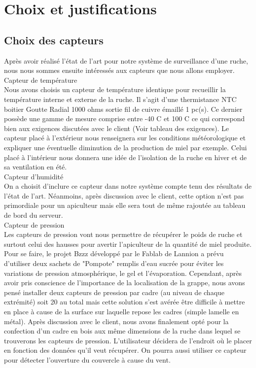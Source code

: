 

\chapter{Choix et justifications}

\section{Choix des capteurs}
\vspace{1.5cm}
Après avoir réalisé l'état de l'art pour notre système de surveillance d'une ruche, nous nous sommes ensuite intéressés aux capteurs que nous allons employer.\\

Capteur de température\\

Nous avons choisis un capteur de température identique pour recueillir la température interne et externe de la ruche.
Il s'agit d'une thermistance NTC boitier Goutte Radial 1000 ohms sortie fil de cuivre émaillé 1 pc(s). Ce dernier possède une gamme de mesure comprise entre -40 C et 100 C ce qui correspond bien aux exigences discutées avec le client (Voir tableau des exigences). Le capteur placé à l'extérieur nous renseignera sur les conditions météorologique et expliquer une éventuelle diminution de la production de miel par exemple. Celui placé à l'intérieur nous donnera une idée de l'isolation de la ruche en hiver et de sa ventilation en été.\\  

Capteur d'humidité\\

On a choisit d'inclure ce capteur dans notre système compte tenu des résultats de l'état de l'art. Néanmoins, après discussion avec le client, cette option n'est pas primordiale pour un apiculteur mais elle sera tout de même rajoutée au tableau de bord du serveur.\\

Capteur de pression\\

Les capteurs de pression vont nous permettre de récupérer le poids de ruche et surtout celui des hausses pour avertir l'apiculteur de la quantité de miel produite. Pour se faire, le projet Bzzz développé par le Fablab de Lannion a prévu d'utiliser deux sachets de "Pompote" remplis d'eau sucrée pour éviter les variations de pression atmosphérique, le gel et l'évaporation. Cependant, après avoir pris conscience de l'importance de la localisation de la grappe, nous avons pensé installer deux capteurs de pression par cadre (au niveau de chaque extrémité) soit 20 au total mais cette solution s'est avérée être difficile à mettre en place à cause de la surface sur laquelle repose les cadres (simple lamelle en métal). Après discussion avec le client, nous avons finalement opté pour la confection d'un cadre en bois aux même dimensions de la ruche dans lequel se trouverons les capteurs de pression. L'utilisateur décidera de l'endroit où le placer en fonction des données qu'il veut récupérer. 
On pourra aussi utiliser ce capteur pour détecter l'ouverture du couvercle à cause du vent.\\

